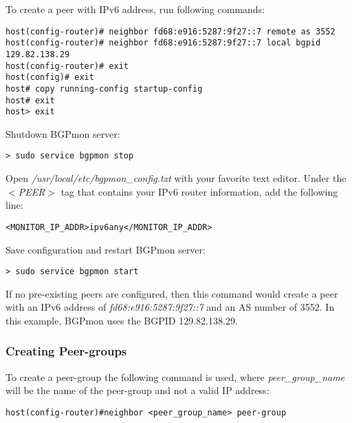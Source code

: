 To create a peer with IPv6 address, run following commands:


\begin{Verbatim}[frame=single]
host(config-router)# neighbor fd68:e916:5287:9f27::7 remote as 3552
host(config-router)# neighbor fd68:e916:5287:9f27::7 local bgpid 129.82.138.29
host(config-router)# exit
host(config)# exit
host# copy running-config startup-config
host# exit
host> exit
\end{Verbatim}

Shutdown BGPmon server:

\begin{Verbatim}[frame=single]
> sudo service bgpmon stop 
\end{Verbatim}

Open \emph{/usr/local/etc/bgpmon\_config.txt} with your favorite text editor. Under the \emph{$<$PEER$>$} tag that contains your IPv6 router information, add the following line:
\begin{Verbatim}[frame=single]
<MONITOR_IP_ADDR>ipv6any</MONITOR_IP_ADDR> 
\end{Verbatim}

Save configuration and restart BGPmon server:
\begin{Verbatim}[frame=single]
> sudo service bgpmon start 
\end{Verbatim}


If no pre-existing peers are configured, then this command would create a peer with an IPv6 address of \emph{fd68:e916:5287:9f27::7} and an AS number of 3552. In this example, BGPmon uses the BGPID 129.82.138.29.



\subsubsection{Creating Peer-groups}
\label{sec:configure:peersgroups:create}

To create a peer-group the following command is used, where \emph{peer\_group\_name} will be the name of the peer-group and not a valid IP address:\\

\begin{Verbatim}[frame=single]
host(config-router)#neighbor <peer_group_name> peer-group
\end{Verbatim}

